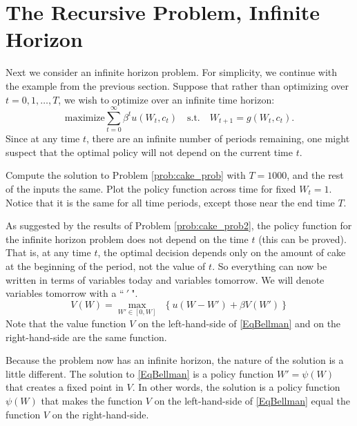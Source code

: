 \section*{The Recursive Problem, Infinite Horizon}\label{SecRecProbInFHor}
Next we consider an infinite horizon problem.  For simplicity, we continue with the example from the previous section.
Suppose that rather than optimizing over $t = 0,1,\ldots,T$, we wish to optimize over an infinite time horizon:
\begin{equation*}
\text{maximize} \sum_{t=0}^\infty \beta^t u(W_t,c_t) \quad \text{s.t.} \quad W_{t+1} = g(W_t,c_t).
\end{equation*}
Since at any time $t$, there are an infinite number of periods remaining, one might suspect that the optimal policy will
not depend on the current time $t$.

\begin{problem}
\label{prob:cake_prob2}
Compute the solution to Problem \ref{prob:cake_prob} with $T = 1000$, and the rest of the inputs the same.
Plot the policy function across time for fixed $W_t = 1$.
Notice that it is the same for all time periods, except those near the end time $T$.
\end{problem}

As suggested by the results of Problem \ref{prob:cake_prob2},  the policy function for the infinite horizon problem does not
depend on the time $t$ (this can be proved).  That is, at any time $t$, the optimal decision depends only on the amount of cake
at the beginning of the period, not the value of $t$.  So everything can now be written in terms of variables today and variables
tomorrow. We will denote variables tomorrow with a ``$\:'\:$".
\begin{equation}
\label{EqBellman}
V\left(W\right) = \max_{W'\in[0,W]}\:\: \left\{u\left(W - W'\right) + \beta V\left(W'\right)\right\}
\end{equation}
Note that the value function $V$ on the left-hand-side of \eqref{EqBellman} and on the right-hand-side are the same function.

Because the problem now has an infinite horizon, the nature of the solution is a little different. The solution to \eqref{EqBellman}
is a policy function $W'=\psi(W)$ that creates a fixed point in $V$. In other words, the solution is a policy function $\psi(W)$
that makes the function $V$ on the left-hand-side of \eqref{EqBellman} equal the function $V$ on the right-hand-side.

